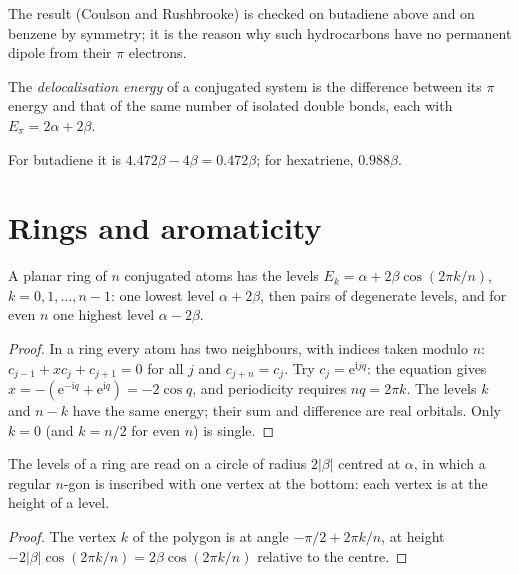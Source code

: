 \admitted

The result (Coulson and Rushbrooke) is checked on butadiene above and on benzene by
symmetry; it is the reason why such hydrocarbons have no permanent dipole from their
$\pi$ electrons.

\begin{definition}\label{def:b2:huckel:delocalisation}
The \emph{delocalisation energy} of a conjugated
system is the difference between its $\pi$ energy and that of the same number of
isolated double bonds, each with $E_\pi = 2\alpha + 2\beta$.
\end{definition}

For butadiene it is $4.472\beta - 4\beta = 0.472\beta$; for hexatriene, $0.988\beta$.

\section{Rings and aromaticity}

\begin{theorem}\label{thm:b2:huckel:ring}
A planar ring of $n$ conjugated atoms has the levels $E_k = \alpha + 2\beta\cos(2\pi k/n)$,
$k = 0, 1, \dots, n - 1$: one lowest level $\alpha + 2\beta$, then pairs of degenerate
levels, and for even $n$ one highest level $\alpha - 2\beta$.
\end{theorem}

\begin{proof}
In a ring every atom has two neighbours, with indices taken modulo $n$:
$c_{j-1} + xc_j + c_{j+1} = 0$ for all $j$ and $c_{j+n} = c_j$. Try $c_j = \mathrm e^{\mathrm
i jq}$: the equation gives $x = -(\mathrm e^{-\mathrm iq} + \mathrm e^{\mathrm iq}) = -2\cos q$,
and periodicity requires $nq = 2\pi k$. The levels $k$ and $n - k$ have the same
energy; their sum and difference are real orbitals. Only $k = 0$ (and $k = n/2$ for
even $n$) is single.
\end{proof}

\begin{corollary}\label{cor:b2:huckel:frost}
The levels of a ring are read on a circle of radius $2|\beta|$ centred at $\alpha$, in
which a regular $n$-gon is inscribed with one vertex at the bottom: each vertex is
at the height of a level.
\end{corollary}

\begin{proof}
The vertex $k$ of the polygon is at angle $-\pi/2 + 2\pi k/n$, at height
$-2|\beta|\cos(2\pi k/n) = 2\beta\cos(2\pi k/n)$ relative to the centre.
\end{proof}

